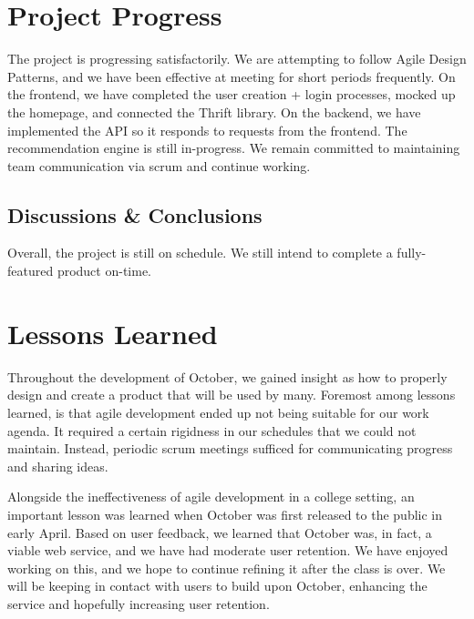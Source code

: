 \documentclass[11pt,letterpaper]{article}
\begin{document}
\section{Project Progress}
\label{sec:progress}
The project is progressing satisfactorily.
We are attempting to follow Agile Design Patterns, and we have been effective at meeting for short periods frequently.
On the frontend, we have completed the user creation + login processes, mocked up the homepage, and connected the Thrift library.
On the backend, we have implemented the API so it responds to requests from the frontend. The recommendation engine is still in-progress.
We remain committed to maintaining team communication via scrum and continue working.

\subsection{Discussions \& Conclusions}
Overall, the project is still on schedule. We still intend to complete a fully-featured product on-time.

\section{Lessons Learned}

Throughout the development of October, we gained insight as how to properly design and create a product that will be used by many. 
Foremost among lessons learned, is that agile development ended up not being suitable for our work agenda. 
It required a certain rigidness in our schedules that we could not maintain. 
Instead, periodic scrum meetings sufficed for communicating progress and sharing ideas. 

Alongside the ineffectiveness of agile development in a college setting, an important lesson was learned when October was first released to the public in early April. 
Based on user feedback, we learned that October was, in fact, a viable web service, and we have had moderate user retention. 
We have enjoyed working on this, and we hope to continue refining it after the class is over. 
We will be keeping in contact with users to build upon October, enhancing the service and hopefully increasing user retention.
\end{document}
